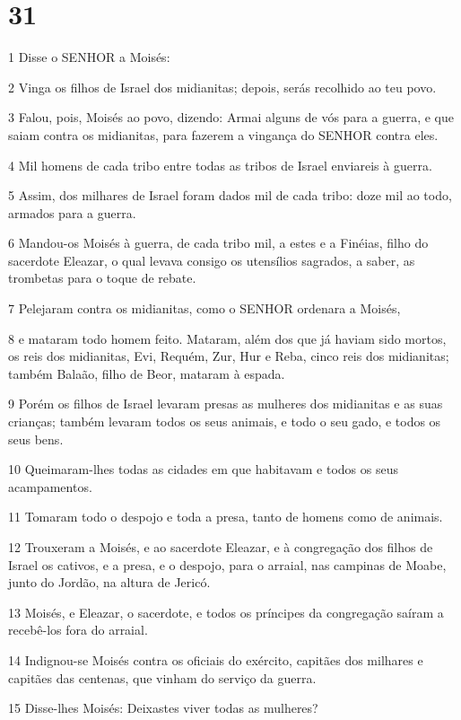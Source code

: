 \chapter{31}

\par 1 Disse o SENHOR a Moisés:
\par 2 Vinga os filhos de Israel dos midianitas; depois, serás recolhido ao teu povo.
\par 3 Falou, pois, Moisés ao povo, dizendo: Armai alguns de vós para a guerra, e que saiam contra os midianitas, para fazerem a vingança do SENHOR contra eles.
\par 4 Mil homens de cada tribo entre todas as tribos de Israel enviareis à guerra.
\par 5 Assim, dos milhares de Israel foram dados mil de cada tribo: doze mil ao todo, armados para a guerra.
\par 6 Mandou-os Moisés à guerra, de cada tribo mil, a estes e a Finéias, filho do sacerdote Eleazar, o qual levava consigo os utensílios sagrados, a saber, as trombetas para o toque de rebate.
\par 7 Pelejaram contra os midianitas, como o SENHOR ordenara a Moisés,
\par 8 e mataram todo homem feito. Mataram, além dos que já haviam sido mortos, os reis dos midianitas, Evi, Requém, Zur, Hur e Reba, cinco reis dos midianitas; também Balaão, filho de Beor, mataram à espada.
\par 9 Porém os filhos de Israel levaram presas as mulheres dos midianitas e as suas crianças; também levaram todos os seus animais, e todo o seu gado, e todos os seus bens.
\par 10 Queimaram-lhes todas as cidades em que habitavam e todos os seus acampamentos.
\par 11 Tomaram todo o despojo e toda a presa, tanto de homens como de animais.
\par 12 Trouxeram a Moisés, e ao sacerdote Eleazar, e à congregação dos filhos de Israel os cativos, e a presa, e o despojo, para o arraial, nas campinas de Moabe, junto do Jordão, na altura de Jericó.
\par 13 Moisés, e Eleazar, o sacerdote, e todos os príncipes da congregação saíram a recebê-los fora do arraial.
\par 14 Indignou-se Moisés contra os oficiais do exército, capitães dos milhares e capitães das centenas, que vinham do serviço da guerra.
\par 15 Disse-lhes Moisés: Deixastes viver todas as mulheres?

